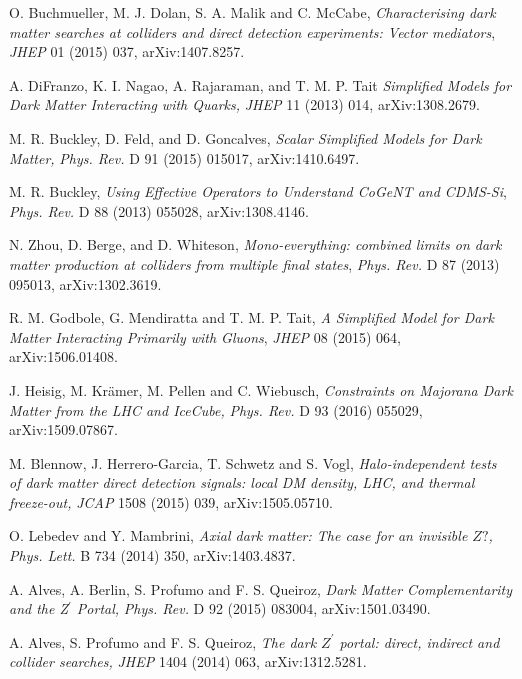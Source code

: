  O. Buchmueller, M. J. Dolan, S. A. Malik and C. McCabe, \emph{Characterising dark matter searches at colliders and direct detection experiments: Vector mediators}, \emph{JHEP} 01 (2015) 037, arXiv:1407.8257.

 A. DiFranzo, K. I. Nagao, A. Rajaraman, and T. M. P. Tait
\emph{Simplified Models for Dark Matter Interacting with Quarks,}
\emph{JHEP} 11 (2013) 014, arXiv:1308.2679.

 M. R. Buckley, D. Feld, and D. Goncalves,
\emph{Scalar Simplified Models for Dark Matter,}
\emph{Phys. Rev.} D 91 (2015) 015017,
arXiv:1410.6497.

 M. R. Buckley, \emph{Using Effective Operators to Understand CoGeNT and CDMS-Si}, \emph{Phys. Rev.} D 88 (2013) 055028, arXiv:1308.4146.

 N. Zhou, D. Berge, and D. Whiteson, \emph{Mono-everything: combined limits on dark matter production at colliders from multiple final states}, \emph{Phys. Rev.} D 87 (2013) 095013, arXiv:1302.3619.

 R. M. Godbole, G. Mendiratta and T. M. P. Tait, \emph{A Simplified Model for Dark Matter Interacting Primarily with Gluons}, \emph{JHEP} 08 (2015) 064, arXiv:1506.01408.

 J. Heisig, M. Kr\"{a}mer, M. Pellen and C. Wiebusch,
\emph{Constraints on Majorana Dark Matter from the LHC and IceCube,} \emph{Phys. Rev.} D 93 (2016) 055029,
  arXiv:1509.07867. %

 M. Blennow, J. Herrero-Garcia, T. Schwetz and S. Vogl,
\emph{Halo-independent tests of dark matter direct detection signals: local DM density, LHC, and thermal freeze-out,}
  \emph{JCAP} 1508 (2015) 039,
  arXiv:1505.05710. %

 O. Lebedev and Y. Mambrini,
\emph{Axial dark matter: The case for an invisible $Z?$,}
  \emph{Phys. Lett.} B 734 (2014) 350,
  arXiv:1403.4837. %

 A. Alves, A. Berlin, S. Profumo and F. S. Queiroz,
\emph{Dark Matter Complementarity and the Z$^{\prime}$ Portal,}
  \emph{Phys. Rev.} D 92 (2015) 083004,
  arXiv:1501.03490. %

 A. Alves, S. Profumo and F. S. Queiroz,
\emph{The dark $Z^{\prime}$ portal: direct, indirect and collider searches,}
  \emph{JHEP} 1404 (2014) 063,
  arXiv:1312.5281. %

